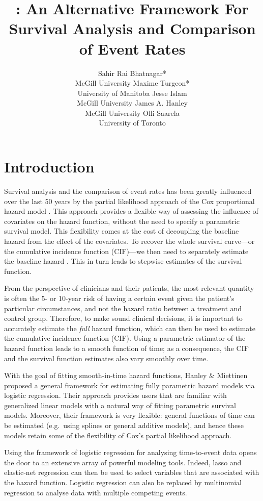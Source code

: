 \documentclass[
]{jss}
\author{
Sahir Rai Bhatnagar*\\McGill University \And Maxime Turgeon*\\University
of Manitoba \AND Jesse Islam\\McGill University \And James A.
Hanley\\McGill University \And Olli Saarela\\University of Toronto
}
\title{\pkg{casebase}: An Alternative Framework For Survival Analysis
and Comparison of Event Rates}
\begin{document}
\hypertarget{introduction}{%
\section{Introduction}\label{introduction}}

Survival analysis and the comparison of event rates has been greatly
influenced over the last 50 years by the partial likelihood approach of
the Cox proportional hazard model \citep{cox1972regression}. This
approach provides a flexible way of assessing the influence of
covariates on the hazard function, without the need to specify a
parametric survival model. This flexibility comes at the cost of
decoupling the baseline hazard from the effect of the covariates. To
recover the whole survival curve---or the cumulative incidence function
(CIF)---we then need to separately estimate the baseline hazard
\citep{breslow1972discussion}. This in turn leads to stepwise estimates
of the survival function.

From the perspective of clinicians and their patients, the most relevant
quantity is often the 5- or 10-year risk of having a certain event given
the patient's particular circumstances, and not the hazard ratio between
a treatment and control group. Therefore, to make sound clinical
decisions, it is important to accurately estimate the \emph{full} hazard
function, which can then be used to estimate the cumulative incidence
function (CIF). Using a parametric estimator of the hazard function
leads to a smooth function of time; as a consequence, the CIF and the
survival function estimates also vary smoothly over time.

With the goal of fitting smooth-in-time hazard functions, Hanley \&
Miettinen \citeyearpar{hanley2009fitting} proposed a general framework
for estimating fully parametric hazard models via logistic regression.
Their approach provides users that are familiar with generalized linear
models with a natural way of fitting parametric survival models.
Moreover, their framework is very flexible: general functions of time
can be estimated (e.g.~using splines or general additive models), and
hence these models retain some of the flexibility of Cox's partial
likelihood approach.

Using the framework of logistic regression for analysing time-to-event
data opens the door to an extensive array of powerful modeling tools.
Indeed, lasso and elastic-net regression can then be used to select
variables that are associated with the hazard function. Logistic
regression can also be replaced by multinomial regression to analyse
data with multiple competing events.
\end{document}
